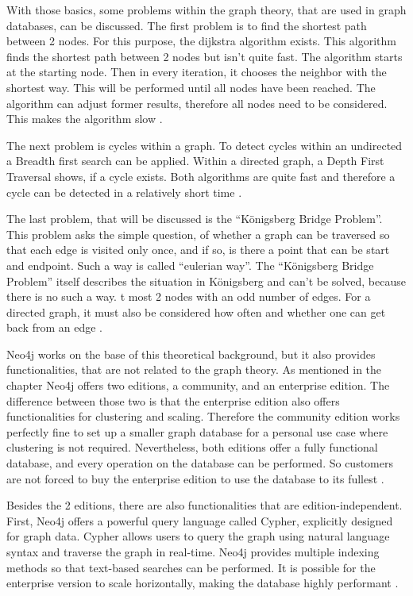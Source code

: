 With those basics, some problems within the graph theory, that are used in graph databases, can be discussed. The first problem is to find the shortest path between 2 nodes. For this purpose, the dijkstra algorithm exists. This algorithm finds the shortest path between 2 nodes but isn't quite fast. The algorithm starts at the starting node. Then in every iteration, it chooses the neighbor with the shortest way. This will be performed until all nodes have been reached.
The algorithm can adjust former results, therefore all nodes need to be considered. This makes the algorithm slow \parencite{dijkstra}.

The next problem is cycles within a graph. To detect cycles within an undirected a Breadth first search can be applied. Within a directed graph, a Depth First Traversal shows, if a cycle exists. Both algorithms are quite fast and therefore a cycle can be detected in a relatively short time \parencite{graphCircle} \parencite{cycle_directed}.

The last problem, that will be discussed is the \enquote{Königsberg Bridge Problem}. This problem asks the simple question, of whether a graph can be traversed so that each edge is visited only once, and if so, is there a point that can be start and endpoint. Such a way is called \enquote{eulerian way}. The
\enquote{Königsberg Bridge Problem}  itself describes the situation in Königsberg and can't be solved, because there is no such a way. t most 2 nodes with an odd number of edges. For a directed graph, it must also be considered how often and whether one can get back from an edge \parencite{koenigsberger}.

Neo4j works on the base of this theoretical background, but it also provides functionalities, that are not related to the graph theory. As mentioned in the chapter  Neo4j offers two editions, a community, and an enterprise edition. The difference between those two is that the enterprise edition also offers functionalities for clustering and scaling. Therefore the community edition works perfectly fine to set up a smaller
graph database for a personal use case where clustering is not required. Nevertheless, both editions offer a fully functional database, and every operation on the database can be performed. So customers are not forced to buy the enterprise edition to use the database to its fullest \parencite{Neo4jfeatures}.

Besides the 2 editions, there are also functionalities that are edition-independent. First, Neo4j offers a powerful query language called Cypher, explicitly designed for graph data. Cypher allows users to query the graph using natural language syntax and traverse the graph in real-time. Neo4j provides multiple indexing methods so that text-based searches can be performed.
It is possible for the enterprise version to scale horizontally, making the database highly performant \parencite{Neo4jfeatures}.

